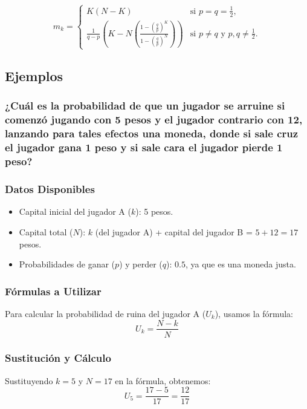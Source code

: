 \documentclass{article}
\begin{document}
\[
    m_k =
    \begin{cases}
        K(N-K)                                                                                                          & \text{si } p = q = \frac{1}{2},                       \\[10pt]
        \frac{1}{q-p}\left( K - N\left(\frac{1-\left(\frac{q}{p}\right)^K}{1-\left(\frac{q}{p}\right)^N}\right) \right) & \text{si } p \neq q \text{ y } p, q \neq \frac{1}{2}.
    \end{cases}
\]

\newpage

\subsection*{Ejemplos}

\subsubsection*{¿Cuál es la probabilidad de que un jugador se arruine si comenzó jugando con 5 pesos y el jugador contrario con 12, lanzando para tales efectos una moneda, donde si sale cruz el jugador gana 1 peso y si sale cara el jugador pierde 1 peso?}

\subsubsection*{Datos Disponibles}
\begin{itemize}
    \item Capital inicial del jugador A (\(k\)): 5 pesos.
    \item Capital total (\(N\)): \(k\) (del jugador A) + capital del jugador B = \(5 + 12 = 17\) pesos.
    \item Probabilidades de ganar (\(p\)) y perder (\(q\)): \(0.5\), ya que es una moneda justa.
\end{itemize}

\subsubsection*{Fórmulas a Utilizar}
Para calcular la probabilidad de ruina del jugador A (\(U_k\)), usamos la fórmula:
\[ U_k = \frac{N - k}{N} \]

\subsubsection*{Sustitución y Cálculo}
Sustituyendo \(k = 5\) y \(N = 17\) en la fórmula, obtenemos:
\[ U_5 = \frac{17 - 5}{17} = \frac{12}{17} \]
\end{document}
